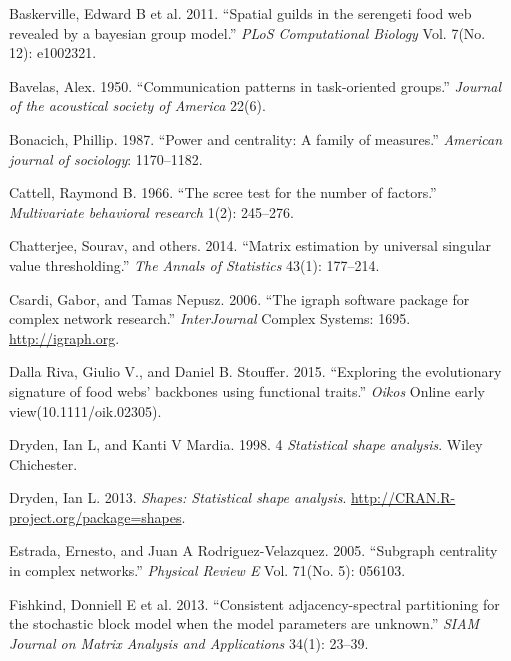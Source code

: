 \documentclass[11pt,article,oneside]{memoir}
\begin{document}
Baskerville, Edward B et al. 2011. ``Spatial guilds in the serengeti
food web revealed by a bayesian group model.'' \emph{PLoS Computational
Biology} Vol. 7(No. 12): e1002321.

Bavelas, Alex. 1950. ``Communication patterns in task-oriented groups.''
\emph{Journal of the acoustical society of America} 22(6).

Bonacich, Phillip. 1987. ``Power and centrality: A family of measures.''
\emph{American journal of sociology}: 1170--1182.

Cattell, Raymond B. 1966. ``The scree test for the number of factors.''
\emph{Multivariate behavioral research} 1(2): 245--276.

Chatterjee, Sourav, and others. 2014. ``Matrix estimation by universal
singular value thresholding.'' \emph{The Annals of Statistics} 43(1):
177--214.

Csardi, Gabor, and Tamas Nepusz. 2006. ``The igraph software package for
complex network research.'' \emph{InterJournal} Complex Systems: 1695.
\url{http://igraph.org}.

Dalla Riva, Giulio V., and Daniel B. Stouffer. 2015. ``Exploring the
evolutionary signature of food webs' backbones using functional
traits.'' \emph{Oikos} Online early view(10.1111/oik.02305).

Dryden, Ian L, and Kanti V Mardia. 1998. 4 \emph{Statistical shape
analysis}. Wiley Chichester.

Dryden, Ian L. 2013. \emph{Shapes: Statistical shape analysis}.
\url{http://CRAN.R-project.org/package=shapes}.

Estrada, Ernesto, and Juan A Rodriguez-Velazquez. 2005. ``Subgraph
centrality in complex networks.'' \emph{Physical Review E} Vol. 71(No.
5): 056103.

Fishkind, Donniell E et al. 2013. ``Consistent adjacency-spectral
partitioning for the stochastic block model when the model parameters
are unknown.'' \emph{SIAM Journal on Matrix Analysis and Applications}
34(1): 23--39.
\end{document}
